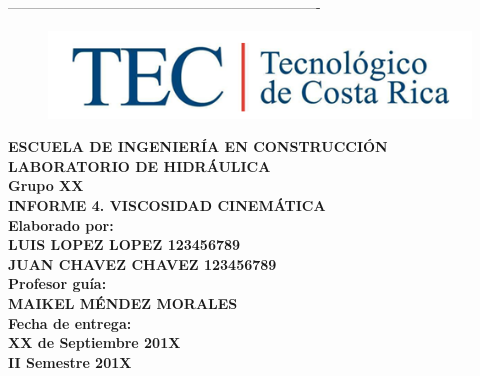 \documentclass[12pt, letterpaper]{article}
\begin{document}
-------------------------------------------------------------------
\begin{titlepage}

\begin{center} 

\begin{figure}[H]
	\centering
	\includegraphics[width=1\columnwidth]{LOGO_TEC.png}
\end{figure}

	\textbf{\large{ESCUELA DE INGENIERÍA EN CONSTRUCCIÓN}}\\
	\textbf{\large{LABORATORIO DE HIDRÁULICA}}\\
	\textbf{\large{Grupo XX}} \\

\vspace{1in} %
\textbf{\large{INFORME 4. VISCOSIDAD CINEMÁTICA}}\\
\vspace{1in}
\textbf{\large{Elaborado por:}}\\
\textbf{\large{LUIS LOPEZ LOPEZ  123456789}}\\
\textbf{\large{JUAN CHAVEZ CHAVEZ  123456789}}\\
\vspace{0.5in}
\textbf{\large{Profesor guía:}}\\
\textbf{\large{MAIKEL MÉNDEZ MORALES}}\\
\vspace{0.5in}
\textbf{\large{Fecha de entrega:}}\\
\textbf{\large{XX de Septiembre 201X}}\\
\vspace{1in}
\textbf{\large{II Semestre 201X}}\\

\end{center}

\end{titlepage}
\end{document}
